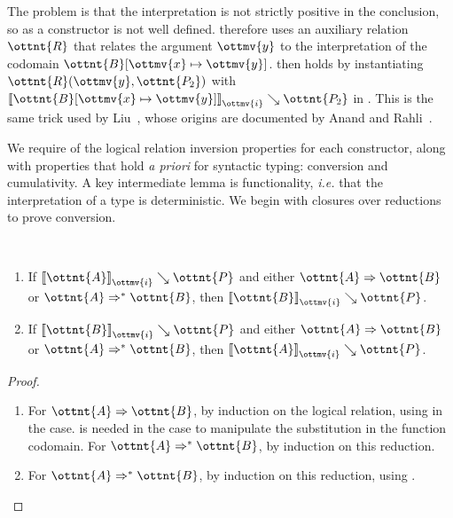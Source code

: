 \documentclass[a4paper,UKenglish,cleveref,autoref,thm-restate]{lipics-v2021}
\makeatletter
\newcommand{\citep}[1]{\cite{#1}}
\newcommand{\ie}{\textit{i.e.}\@\xspace}
\newcommand{\apriori}{\textit{a priori}\@\xspace}
\makeatother
\begin{document}
The problem is that the interpretation is not strictly positive in the conclusion,
so  as a constructor is not well defined.
 therefore uses an auxiliary relation $\ottnt{R}$
that relates the argument $\ottmv{y}$ to the interpretation of the codomain $ \ottnt{B} [  \ottmv{x}  \mapsto  \ottmv{y}  ] $.
 then holds by instantiating $ \ottnt{R} ( \ottmv{y} ,  \ottnt{P_{{\mathrm{2}}}} ) $ with $ \mathopen{\llbracket}   \ottnt{B} [  \ottmv{x}  \mapsto  \ottmv{y}  ]   \mathclose{\rrbracket}_{ \ottmv{i} } \searrow  \ottnt{P_{{\mathrm{2}}}} $ in .
This is the same trick used by Liu~\citep{lr-pearl},
whose origins are documented by Anand and Rahli~\citep{mech-nuprl}.

We require of the logical relation inversion properties for each constructor,
along with properties that hold \apriori for syntactic typing:
conversion and cumulativity.
A key intermediate lemma is functionality,
\ie that the interpretation of a type is deterministic.
We begin with closures over reductions to prove conversion.

\begin{lemma} \label{lem:lr:pars} ~
  \begin{enumerate}
    \item If $ \mathopen{\llbracket}  \ottnt{A}  \mathclose{\rrbracket}_{ \ottmv{i} } \searrow  \ottnt{P} $ and either $ \ottnt{A}  \Rightarrow  \ottnt{B} $ or $ \ottnt{A}  \Rightarrow^\ast  \ottnt{B} $,
      then $ \mathopen{\llbracket}  \ottnt{B}  \mathclose{\rrbracket}_{ \ottmv{i} } \searrow  \ottnt{P} $.
    \item If $ \mathopen{\llbracket}  \ottnt{B}  \mathclose{\rrbracket}_{ \ottmv{i} } \searrow  \ottnt{P} $ and either $ \ottnt{A}  \Rightarrow  \ottnt{B} $ or $ \ottnt{A}  \Rightarrow^\ast  \ottnt{B} $,
      then $ \mathopen{\llbracket}  \ottnt{A}  \mathclose{\rrbracket}_{ \ottmv{i} } \searrow  \ottnt{P} $.
  \end{enumerate}
\end{lemma}

\begin{proof} ~
  \begin{enumerate}
    \item For $ \ottnt{A}  \Rightarrow  \ottnt{B} $, by induction on the logical relation,
      using  in the  case.
       is needed in the  case
      to manipulate the substitution in the function codomain.
      For $ \ottnt{A}  \Rightarrow^\ast  \ottnt{B} $, by induction on this reduction.
    \item For $ \ottnt{A}  \Rightarrow^\ast  \ottnt{B} $, by induction on this reduction,
      using . \qedhere
  \end{enumerate}
\end{proof}
\end{document}
